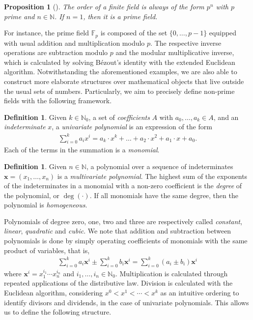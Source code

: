 \documentclass[12pt, a4paper, oneside]{memoir}
\newtheorem{proposition}[theorem]{Proposition}
\theoremstyle{definition}
\newtheorem{definition}[theorem]{Definition}
\begin{document}
\begin{proposition}[{\cite[Corollary 2.18]{Mullen:2013}}]
  The order of a finite field is always of the form $p^{n}$ with $p$ prime and $n \in \mathbb{N}$. If $n = 1$, then it is a \emph{prime field}.
\end{proposition}

For instance, the prime field $\mathbb{F}_{p}$ is composed of the set $\{0, \dots, p - 1\}$ equipped with usual addition and multiplication modulo $p$. The respective inverse operations are subtraction modulo $p$ and the modular multiplicative inverse, which is calculated by solving Bézout's identity with the extended Euclidean algorithm. Notwithstanding the aforementioned examples, we are also able to construct more elaborate structures over mathematical objects that live outside the usual sets of numbers. Particularly, we aim to precisely define non-prime fields with the following framework.

\begin{definition}
  Given $k \in \mathbb{N}_{0}$, a set of \emph{coefficients} $A$ with $a_{0}, \dots, a_{k} \in A$, and an \emph{indeterminate} $x$, a \emph{univariate polynomial} is an expression of the form
  \begin{align}
    \sum_{i = 0}^{k} a_{i} x^{i} 
      = a_{k} \cdot x^{k} + \dots + a_{2} \cdot x^{2} + a_{1} \cdot x + a_{0}.
  \end{align}
  Each of the terms in the summation is a \emph{monomial}.
\end{definition}

\begin{definition}
  Given $n \in \mathbb{N}$, a polynomial over a sequence of indeterminates $\mathbf{x} = (x_{1}, \dots, x_{n})$ is a \emph{multivariate polynomial}. The highest sum of the exponents of the indeterminates in a monomial with a non-zero coefficient is the \emph{degree} of the polynomial, or $\deg(\cdot)$. If all monomials have the same degree, then the polynomial is \emph{homogeneous}.
\end{definition}

Polynomials of degree zero, one, two and three are respectively called \emph{constant}, \emph{linear}, \emph{quadratic} and \emph{cubic}. We note that addition and subtraction between polynomials is done by simply operating coefficients of monomials with the same product of variables, that is,
\begin{align}
  \sum_{i = 0}^{k} a_{i} \mathbf{x}^{i} \pm \sum_{i = 0}^{k} b_{i} \mathbf{x}^{i} = \sum_{i = 0}^{k} (a_{i} \pm b_{i}) \mathbf{x}^{i}
\end{align}
where $\mathbf{x}^{i} = x_{1}^{i_{1}} \cdots x_{n}^{i_{n}}$ and $i_{1}, \dots, i_{n} \in \mathbb{N}_{0}$. Multiplication is calculated through repeated applications of the distributive law. Division is calculated with the Euclidean algorithm, considering $x^{0} < x^{1} < \cdots < x^{k}$ as an intuitive ordering to identify divisors and dividends, in the case of univariate polynomials. This allows us to define the following structure.
\end{document}
